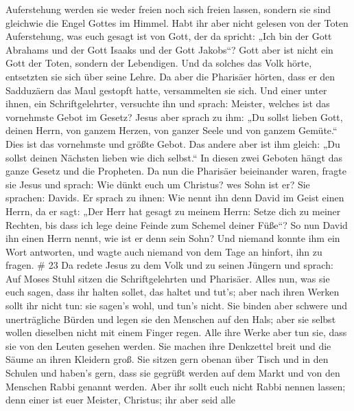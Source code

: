 Auferstehung werden sie weder freien noch sich freien lassen, sondern
sie sind gleichwie die Engel Gottes im Himmel.  Habt ihr
aber nicht gelesen von der Toten Auferstehung, was euch gesagt ist von
Gott, der da spricht:  „Ich bin der Gott Abrahams und der
Gott Isaaks und der Gott Jakobs``? Gott aber ist nicht ein Gott der
Toten, sondern der Lebendigen.  Und da solches das Volk
hörte, entsetzten sie sich über seine Lehre.  Da aber die
Pharisäer hörten, dass er den Sadduzäern das Maul gestopft hatte,
versammelten sie sich.  Und einer unter ihnen, ein
Schriftgelehrter, versuchte ihn und sprach:  Meister,
welches ist das vornehmste Gebot im Gesetz?  Jesus aber
sprach zu ihm: „Du sollst lieben Gott, deinen Herrn, von ganzem Herzen,
von ganzer Seele und von ganzem Gemüte.``  Dies ist das
vornehmste und größte Gebot.  Das andere aber ist ihm
gleich: „Du sollst deinen Nächsten lieben wie dich selbst.``
 In diesen zwei Geboten hängt das ganze Gesetz und die
Propheten.  Da nun die Pharisäer beieinander waren, fragte
sie Jesus  und sprach: Wie dünkt euch um Christus? wes Sohn
ist er? Sie sprachen: Davids.  Er sprach zu ihnen: Wie
nennt ihn denn David im Geist einen Herrn, da er sagt: 
„Der Herr hat gesagt zu meinem Herrn: Setze dich zu meiner Rechten, bis
dass ich lege deine Feinde zum Schemel deiner Füße``?  So
nun David ihn einen Herrn nennt, wie ist er denn sein Sohn?
 Und niemand konnte ihm ein Wort antworten, und wagte auch
niemand von dem Tage an hinfort, ihn zu fragen. \# 23  Da
redete Jesus zu dem Volk und zu seinen Jüngern  und sprach:
Auf Moses Stuhl sitzen die Schriftgelehrten und Pharisäer. 
Alles nun, was sie euch sagen, dass ihr halten sollet, das haltet und
tut's; aber nach ihren Werken sollt ihr nicht tun: sie sagen's wohl, und
tun's nicht.  Sie binden aber schwere und unerträgliche
Bürden und legen sie den Menschen auf den Hals; aber sie selbst wollen
dieselben nicht mit einem Finger regen.  Alle ihre Werke
aber tun sie, dass sie von den Leuten gesehen werden. Sie machen ihre
Denkzettel breit und die Säume an ihren Kleidern groß.  Sie
sitzen gern obenan über Tisch und in den Schulen  und
haben's gern, dass sie gegrüßt werden auf dem Markt und von den Menschen
Rabbi genannt werden.  Aber ihr sollt euch nicht Rabbi
nennen lassen; denn einer ist euer Meister, Christus; ihr aber seid alle
